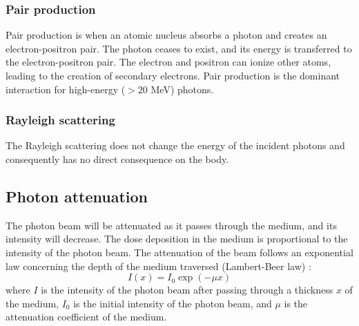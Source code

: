 \subsubsection{Pair production}
Pair production is when an atomic nucleus absorbs a photon and creates an electron-positron pair.
The photon ceases to exist, and its energy is transferred to the electron-positron pair.
The electron and positron can ionize other atoms, leading to the creation of secondary electrons.
Pair production is the dominant interaction for high-energy ($ > 20$ MeV) photons.

\subsubsection{Rayleigh scattering}
The Rayleigh scattering does not change the energy of the incident photons and consequently has no direct consequence on the body. 


\subsection{Photon attenuation}
The photon beam will be attenuated as it passes through the medium, and its intensity will decrease.
The dose deposition in the medium is proportional to the intensity of the photon beam.
The attenuation of the beam follows an exponential law concerning the depth of the medium traversed (Lambert-Beer law) \cite{Beer1852}:
$$I(x) = I_0 \exp(-\mu x)$$
where $I$ is the intensity of the photon beam after passing through a thickness $x$ of the medium,
$I_0$ is the initial intensity of the photon beam,
and $\mu$ is the attenuation coefficient of the medium.







